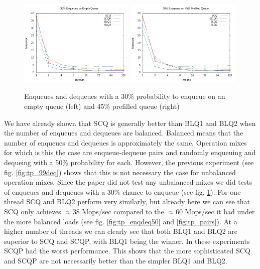 \documentclass{article}      %
\begin{document}
\begin{figure}[H]
	\centering
	\includegraphics[width=0.49\textwidth]{Pictures/tp_30enq_empty.png}
	\includegraphics[width=0.49\textwidth]{Pictures/tp_30enq_90.png}
	\caption{Enqueues and dequeues with a 30\% probability to enqueue on an empty queue (left) and 45\% prefilled queue (right)}
	\label{fig:tp_enqdeq30}
\end{figure}

We have already shown that SCQ is generally better than BLQ1 and BLQ2 when the number of enqueues and dequeues are balanced. Balanced means that the number of enqueues and dequeues is approximately the same. Operation mixes for which is this the case are enqueue-dequeue pairs and randomly enqueuing and dequeing with a 50\% probability for each. However, the previous experiment (see fig. \ref{fig:tp_99deq}) shows that this is not necessary the case for unbalanced operation mixes. Since the paper did not test any unbalanced mixes we did tests of enqueues and dequeues with a 30\% chance to enqueue (see fig. \ref{fig:tp_enqdeq30}). For one thread SCQ and BLQ2 perform very similarly, but already here we can see that SCQ only achieves $\approx 38$ Mops/sec compared to the $\approx 60$ Mops/sec it had under the more balanced loads (see fig. \ref{fig:tp_enqdeq50} and \ref{fig:tp_pairs}). At a higher number of threads we can clearly see that both BLQ1 and BLQ2 are superior to SCQ and SCQP, with BLQ1 being the winner. In these experiments SCQP had the worst performance. This shows that the more sophisticated SCQ and SCQP are not necessarily better than the simpler BLQ1 and BLQ2.
\end{document}
